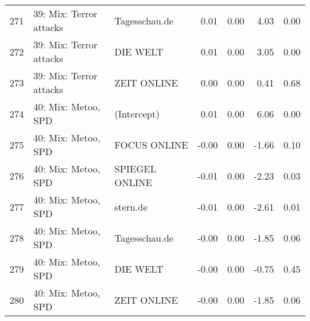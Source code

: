 \begin{table}[ht]
{\begin{tabular}{rllrrrr}
  271 & 39: Mix: Terror attacks & Tagesschau.de & 0.01 & 0.00 & 4.03 & 0.00 \\ 
  272 & 39: Mix: Terror attacks & DIE WELT & 0.01 & 0.00 & 3.05 & 0.00 \\ 
  273 & 39: Mix: Terror attacks & ZEIT ONLINE & 0.00 & 0.00 & 0.41 & 0.68 \\ 
  274 & 40: Mix: Metoo, SPD & (Intercept) & 0.01 & 0.00 & 6.06 & 0.00 \\ 
  275 & 40: Mix: Metoo, SPD & FOCUS ONLINE & -0.00 & 0.00 & -1.66 & 0.10 \\ 
  276 & 40: Mix: Metoo, SPD & SPIEGEL ONLINE & -0.01 & 0.00 & -2.23 & 0.03 \\ 
  277 & 40: Mix: Metoo, SPD & stern.de & -0.01 & 0.00 & -2.61 & 0.01 \\ 
  278 & 40: Mix: Metoo, SPD & Tagesschau.de & -0.00 & 0.00 & -1.85 & 0.06 \\ 
  279 & 40: Mix: Metoo, SPD & DIE WELT & -0.00 & 0.00 & -0.75 & 0.45 \\ 
  280 & 40: Mix: Metoo, SPD & ZEIT ONLINE & -0.00 & 0.00 & -1.85 & 0.06 \\ 
   \hline
\end{tabular}
}
\end{table}
